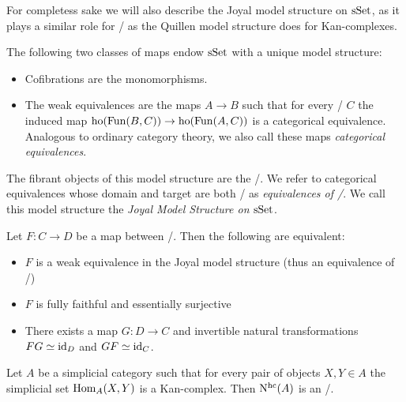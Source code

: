 For completess sake we will also describe the Joyal model structure on $\operatorname{sSet}$, as it plays a similar role for \inftycats/ as the Quillen model structure does for Kan-complexes.
\begin{prop}
    The following two classes of maps endow $\operatorname{sSet}$ with a unique model structure:
    \begin{itemize}
        \item Cofibrations are the monomorphisms.
        \item The weak equivalences are the maps $A\to B$ such that for every \inftycat/ $C$ the induced map $\operatorname{ho}(\operatorname{Fun}(B,C))\to\operatorname{ho}(\operatorname{Fun}(A,C))$ is a categorical equivalence.
            Analogous to ordinary category theory, we also call these maps \emph{categorical equivalences}.
    \end{itemize}
    The fibrant objects of this model structure are the \inftycats/.
    We refer to categorical equivalences whose domain and target are both \inftycats/ as \emph{equivalences of \inftycats/}.
    We call this model structure the \emph{Joyal Model Structure on $\operatorname{sSet}$}.
    \begin{reference}
        \cite[Definition 3.3.7]{cisinski_2019}
    \end{reference}
\end{prop}
\begin{prop}
    Let $F\colon C\to D$ be a map between \inftycats/.
    Then the following are equivalent:
    \begin{itemize}
        \item $F$ is a weak equivalence in the Joyal model structure (thus an equivalence of \inftycats/)
        \item $F$ is fully faithful and essentially surjective
        \item There exists a map $G\colon D\to C$ and invertible natural transformations $FG\simeq \text{id}_D$ and $GF\simeq \text{id}_C$.
    \end{itemize}
    \begin{reference}
        \cite[Corollary 3.6.6 and Theorem 3.9.7]{cisinski_2019}
    \end{reference}
\end{prop}
\begin{prop}
    Let $A$ be a simplicial category such that for every pair of objects $X,Y\in A$ the simplicial set $\operatorname{Hom}_A(X,Y)$ is a Kan-complex.
    Then $\operatorname{N^{hc}}(A)$ is an \inftycat/.
    \begin{reference}
        \cite[Theorem 2.4.5.1]{kerodon}
    \end{reference}
\end{prop}
